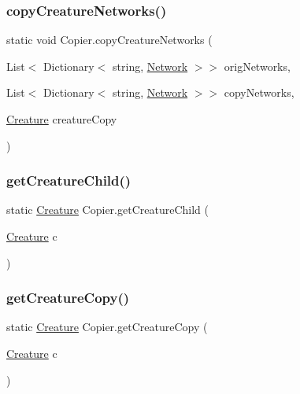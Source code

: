 \subsubsection{\texorpdfstring{copy\+Creature\+Networks()}{copyCreatureNetworks()}}
{\footnotesize\ttfamily static void Copier.\+copy\+Creature\+Networks (\begin{DoxyParamCaption}\item[{List$<$ Dictionary$<$ string, \mbox{\hyperlink{class_network}{Network}} $>$$>$}]{orig\+Networks,  }\item[{List$<$ Dictionary$<$ string, \mbox{\hyperlink{class_network}{Network}} $>$$>$}]{copy\+Networks,  }\item[{\mbox{\hyperlink{class_creature}{Creature}}}]{creature\+Copy }\end{DoxyParamCaption})\hspace{0.3cm}{\ttfamily [static]}}

\mbox{\label{class_copier_a399f96d475da045dd0e9434c9054f161}} 
\subsubsection{\texorpdfstring{get\+Creature\+Child()}{getCreatureChild()}}
{\footnotesize\ttfamily static \mbox{\hyperlink{class_creature}{Creature}} Copier.\+get\+Creature\+Child (\begin{DoxyParamCaption}\item[{\mbox{\hyperlink{class_creature}{Creature}}}]{c }\end{DoxyParamCaption})\hspace{0.3cm}{\ttfamily [static]}}

\mbox{\label{class_copier_a468c753ccc3b2192bb49b8be03edf18c}} 
\subsubsection{\texorpdfstring{get\+Creature\+Copy()}{getCreatureCopy()}}
{\footnotesize\ttfamily static \mbox{\hyperlink{class_creature}{Creature}} Copier.\+get\+Creature\+Copy (\begin{DoxyParamCaption}\item[{\mbox{\hyperlink{class_creature}{Creature}}}]{c }\end{DoxyParamCaption})\hspace{0.3cm}{\ttfamily [static]}}


